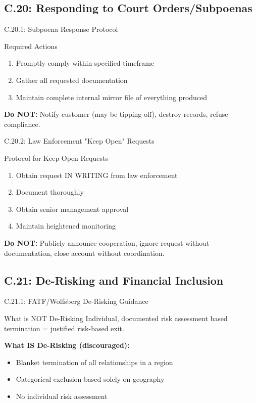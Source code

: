 \documentclass{beamer}
\begin{document}
		\subsection{C.20: Responding to Court Orders/Subpoenas}
		
		\begin{frame}{C.20.1: Subpoena Response Protocol}
			\begin{block}{Required Actions}
				\begin{enumerate}
					\item Promptly comply within specified timeframe
					\item Gather all requested documentation
					\item Maintain complete internal mirror file of everything produced
				\end{enumerate}
			\end{block}
			\textbf{Do NOT:} Notify customer (may be tipping-off), destroy records, refuse compliance.
		\end{frame}
		
		\begin{frame}{C.20.2: Law Enforcement "Keep Open" Requests}
			\begin{block}{Protocol for Keep Open Requests}
				\begin{enumerate}
					\item Obtain request IN WRITING from law enforcement
					\item Document thoroughly
					\item Obtain senior management approval
					\item Maintain heightened monitoring
				\end{enumerate}
			\end{block}
			\textbf{Do NOT:} Publicly announce cooperation, ignore request without documentation, close account without coordination.
		\end{frame}
		
		\subsection{C.21: De-Risking and Financial Inclusion}
		
		\begin{frame}{C.21.1: FATF/Wolfsberg De-Risking Guidance}
			\begin{block}{What is NOT De-Risking}
				Individual, documented risk assessment based termination = justified risk-based exit.
			\end{block}
			\textbf{What IS De-Risking (discouraged):}
			\begin{itemize}
				\item Blanket termination of all relationships in a region
				\item Categorical exclusion based solely on geography
				\item No individual risk assessment
			\end{itemize}
		\end{frame}
		
\end{document}
